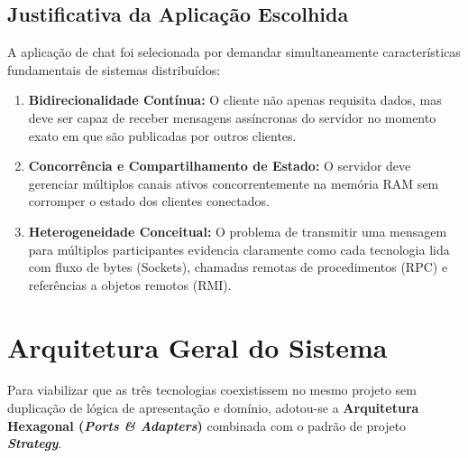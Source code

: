\documentclass[12pt,a4paper]{article}
\begin{document}
\subsection{Justificativa da Aplicação Escolhida}
A aplicação de chat foi selecionada por demandar simultaneamente características fundamentais de sistemas distribuídos:
\begin{enumerate}
    \item \textbf{Bidirecionalidade Contínua:} O cliente não apenas requisita dados, mas deve ser capaz de receber mensagens assíncronas do servidor no momento exato em que são publicadas por outros clientes.
    \item \textbf{Concorrência e Compartilhamento de Estado:} O servidor deve gerenciar múltiplos canais ativos concorrentemente na memória RAM sem corromper o estado dos clientes conectados.
    \item \textbf{Heterogeneidade Conceitual:} O problema de transmitir uma mensagem para múltiplos participantes evidencia claramente como cada tecnologia lida com fluxo de bytes (Sockets), chamadas remotas de procedimentos (RPC) e referências a objetos remotos (RMI).
\end{enumerate}

\section{Arquitetura Geral do Sistema}

Para viabilizar que as três tecnologias coexistissem no mesmo projeto sem duplicação de lógica de apresentação e domínio, adotou-se a \textbf{Arquitetura Hexagonal (\textit{Ports \& Adapters})} combinada com o padrão de projeto \textbf{\textit{Strategy}}.
\end{document}
